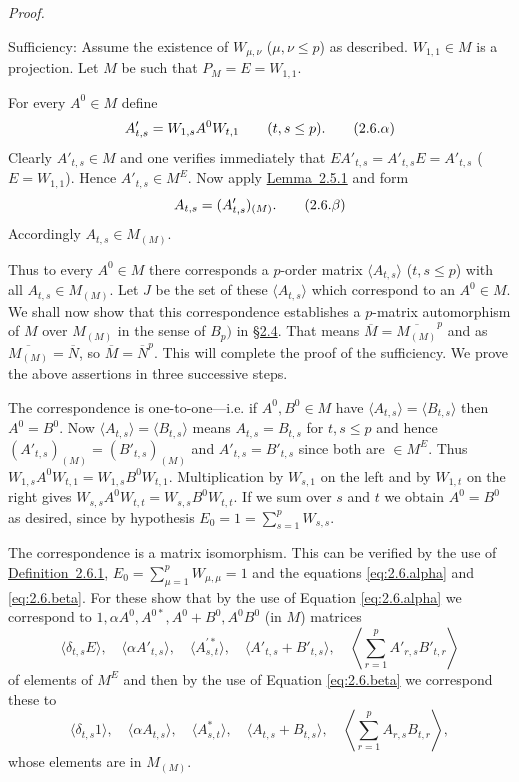 \documentclass[b5paper,twoside]{article}
\newcommand{\secref}[2]{\hyperref[#1]{\mbox{\S#2}}}
\newcommand{\lemref}[2]{\hyperref[#1]{\mbox{Lemma~#2}}}
\newcommand{\defref}[2]{\hyperref[#1]{\mbox{Definition~#2}}}
\theoremstyle{mvnplain}
\renewenvironment{proof}[1][Proof]{%
  \par\addvspace{0.35\baselineskip}%
  \noindent\textit{#1.}\ \normalfont\ignorespaces
}{%
  \par\addvspace{0.35\baselineskip}%
}
\newcommand{\M}{\mathbf M}
\newcommand{\N}{\mathbf N}
\def\M{M}%
\def\N{N}%
\def\mathfrak#1{#1}%
\begin{document}
\begin{proof}
Sufficiency: Assume the existence of $W_{\mu,\nu}$ ($\mu,\nu\leq p$) as
described.  $W_{1,1}\in\M$ is a projection.  Let $\mathfrak M$ be such that
$P_{\mathfrak M}=E=W_{1,1}$.

For every $A^{0}\in\M$ define
\begin{equation}
  A'_{t,s}=W_{1,s}A^{0}W_{t,1}\qquad(t,s\leq p).
  \tag{2.6.\ensuremath{\alpha}}\label{eq:2.6.alpha}
\end{equation}
Clearly $A'_{t,s}\in\M$ and one verifies immediately that
$EA'_{t,s}=A'_{t,s}E=A'_{t,s}$ ($E=W_{1,1}$).  Hence
$A'_{t,s}\in\M^{E}$.  Now apply \lemref{lem:2.5.1}{2.5.1} and form
\begin{equation}
  A_{t,s}=(A'_{t,s})_{(\mathfrak M)}.
  \tag{2.6.\ensuremath{\beta}}\label{eq:2.6.beta}
\end{equation}
Accordingly $A_{t,s}\in\M_{(\mathfrak M)}$.

Thus to every $A^{0}\in\M$ there corresponds a $p$-order matrix
$\langle A_{t,s}\rangle$ ($t,s\leq p$) with all
$A_{t,s}\in\M_{(\mathfrak M)}$.  Let $\mathfrak J$ be the set of these
$\langle A_{t,s}\rangle$ which correspond to an $A^{0}\in\M$.  We shall
now show that this correspondence establishes a $p$-matrix automorphism of
$\M$ over $\M_{(\mathfrak M)}$ in the sense of $B_p)$ in
\secref{sec:2.4}{2.4}.  That means
$\overline{\M}=\overline{\M_{(\mathfrak M)}}^{p}$ and as
$\overline{\M_{(\mathfrak M)}}=\overline{\N}$, so
$\overline{\M}=\overline{\N}^{p}$.  This will complete the proof of the
sufficiency.  We prove the above assertions in three successive steps.

The correspondence is one-to-one---i.e. if $A^{0},B^{0}\in\M$ have
$\langle A_{t,s}\rangle=\langle B_{t,s}\rangle$ then $A^{0}=B^{0}$.
Now $\langle A_{t,s}\rangle=\langle B_{t,s}\rangle$ means
$A_{t,s}=B_{t,s}$ for $t,s\leq p$ and hence
$(A'_{t,s})_{(\mathfrak M)}=(B'_{t,s})_{(\mathfrak M)}$ and
$A'_{t,s}=B'_{t,s}$ since both are $\in\M^{E}$.  Thus
$W_{1,s}A^{0}W_{t,1}=W_{1,s}B^{0}W_{t,1}$.  Multiplication by $W_{s,1}$ on
the left and by $W_{1,t}$ on the right gives
$W_{s,s}A^{0}W_{t,t}=W_{s,s}B^{0}W_{t,t}$.  If we sum over $s$ and $t$ we
obtain $A^{0}=B^{0}$ as desired, since by hypothesis
$E_0=1=\sum_{s=1}^{p}W_{s,s}$.

The correspondence is a matrix isomorphism.  This can be verified by the use
of \defref{def:2.6.1}{2.6.1},
$E_0=\sum_{\mu=1}^{p}W_{\mu,\mu}=1$ and the equations
\eqref{eq:2.6.alpha} and \eqref{eq:2.6.beta}.  For these show that by the use
of Equation \eqref{eq:2.6.alpha} we correspond to
$1,\alpha A^{0},A^{0*},A^{0}+B^{0},A^{0}B^{0}$ (in $\M$) matrices
\[
  \langle\delta_{t,s}E\rangle,
  \quad\langle\alpha A'_{t,s}\rangle,
  \quad\langle A_{s,t}^{\prime *}\rangle,
  \quad\langle A'_{t,s}+B'_{t,s}\rangle,
  \quad\left\langle\sum_{r=1}^{p}A'_{r,s}B'_{t,r}\right\rangle
\]
of elements of $\M^{E}$ and then by the use of Equation
\eqref{eq:2.6.beta} we correspond these to
\[
  \langle\delta_{t,s}1\rangle,
  \quad\langle\alpha A_{t,s}\rangle,
  \quad\langle A_{s,t}^{*}\rangle,
  \quad\langle A_{t,s}+B_{t,s}\rangle,
  \quad\left\langle\sum_{r=1}^{p}A_{r,s}B_{t,r}\right\rangle,
\]
whose elements are in $\M_{(\mathfrak M)}$.


\end{proof}
\end{document}
